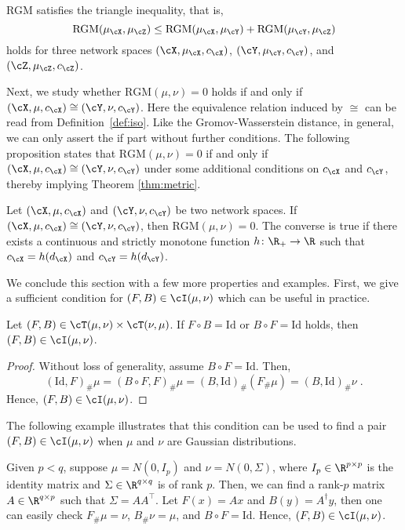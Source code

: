 \documentclass[11pt]{article}
\begin{document}
\begin{proposition}
	\label{prop:2}
	RGM satisfies the triangle inequality, that is,
	\begin{equation*}
		\mathrm{RGM}(\mu_{\cX}, \mu_{\cZ}) \le \mathrm{RGM}(\mu_{\cX}, \mu_{\cY}) + \mathrm{RGM}(\mu_{\cY}, \mu_{\cZ})
	\end{equation*}
	holds for three network spaces $(\cX, \mu_{\cX}, c_{\cX})$, $(\cY, \mu_{\cY}, c_{\cY})$, and $(\cZ, \mu_{\cZ}, c_{\cZ})$.
\end{proposition}


Next, we study whether $\mathrm{RGM}(\mu, \nu) = 0$ holds if and only if $(\cX, \mu, c_{\cX}) \cong (\cY, \nu, c_{\cY})$. Here the equivalence relation induced by $\cong$ can be read from Definition~\ref{def:iso}. Like the Gromov-Wasserstein distance, in general, we can only assert the if part without further conditions. The following proposition states that $\mathrm{RGM}(\mu, \nu) = 0$ if and only if $(\cX, \mu, c_{\cX}) \cong (\cY, \nu, c_{\cY})$ under some additional conditions on $c_{\cX}$ and $c_{\cY}$, thereby implying Theorem \ref{thm:metric}.

\begin{proposition}
	\label{prop:rgm}
	Let $(\cX, \mu, c_{\cX})$ and $(\cY, \nu, c_{\cY})$ be two network spaces. If $(\cX, \mu, c_{\cX}) \cong (\cY, \nu, c_{\cY})$, then $\mathrm{RGM}(\mu, \nu) = 0$. The converse is true if there exists a continuous and strictly monotone function $h \colon \R_+ \to \R$ such that $c_{\cX} = h(d_{\cX})$ and $c_{\cY} = h(d_{\cY})$.
\end{proposition}


We conclude this section with a few more properties and examples. First, we give a sufficient condition for $(F, B) \in \cI(\mu, \nu)$ which can be useful in practice.
\begin{lemma}
	Let $(F, B) \in \cT(\mu, \nu) \times \cT(\nu, \mu)$. If $F \circ B = \mathrm{Id}$ or $B \circ F = \mathrm{Id}$ holds, then $(F, B) \in \cI(\mu, \nu)$.
\end{lemma}
\begin{proof}
	Without loss of generality, assume $B \circ F = \mathrm{Id}$. Then,
	\begin{equation*}
		(\mathrm{Id}, F)_{\#} \mu = (B \circ F, F)_{\#} \mu = (B, \mathrm{Id})_{\#} (F_{\#} \mu) = (B, \mathrm{Id})_{\#} \nu\;.
	\end{equation*}
	Hence, $(F, B) \in \cI(\mu, \nu)$.
\end{proof}

The following example illustrates that this condition can be used to find a pair $(F, B) \in \cI(\mu, \nu)$ when $\mu$ and $\nu$ are Gaussian distributions.
\begin{example}
	Given $p < q$, suppose $\mu = N(0, I_{p})$ and $\nu = N(0, \Sigma)$, where $I_{p} \in \R^{p \times p}$ is the identity matrix and $\Sigma \in \R^{q \times q}$ is of rank $p$. Then, we can find a rank-$p$ matrix $A \in \R^{q \times p}$ such that $\Sigma = A A^\top$. Let $F(x) = A x$ and $B(y) = A^\dagger y$, then one can easily check $F_{\#} \mu = \nu$, $B_{\#} \nu = \mu$, and $B \circ F = \mathrm{Id}$. Hence, $(F, B) \in \cI(\mu, \nu)$.
\end{example}
\end{document}
